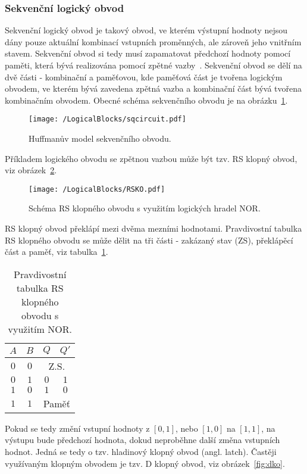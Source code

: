 \documentclass{report}
\begin{document}
\subsubsection{Sekvenční logický obvod}
Sekvenční logický obvod je takový obvod, ve kterém výstupní hodnoty nejsou dány pouze aktuální kombinací vstupních proměnných, ale zároveň jeho vnitřním stavem. Sekvenční obvod si tedy musí zapamatovat předchozí hodnoty pomocí paměti, která bývá realizována pomocí zpětné vazby~\cite{kubatova}. Sekvenční obvod se dělí na dvě části - kombinační a paměťovou, kde paměťová část je tvořena logickým obvodem, ve kterém bývá zavedena zpětná vazba a kombinační část bývá tvořena kombinačním obvodem. Obecné schéma sekvenčního obvodu je na obrázku~\ref{fig:seqcircuit}. \par
\begin{figure}
\centering
\texttt{[image: /LogicalBlocks/sqcircuit.pdf]}
\caption{Huffmanův model sekvenčního obvodu.}
\label{fig:seqcircuit}
\end{figure}
Příkladem logického obvodu se zpětnou vazbou může být tzv. RS klopný obvod, viz obrázek~\ref{fig:rsko}.
\begin{figure}
\centering
\texttt{[image: /LogicalBlocks/RSKO.pdf]}
\caption{Schéma RS klopného obvodu s využitím logických hradel NOR.}
\label{fig:rsko}
\end{figure}
RS klopný obvod překlápí mezi dvěma mezními hodnotami. Pravdivostní tabulka RS klopného obvodu se může dělit na tři části - zakázaný stav (ZS), překlápěcí část a paměť, viz tabulka~\ref{tab:rskotab}.
\begin{table}
\centering
 \begin{tabular}{ |c c|c c| } 
   	\hline
	$A$ & $B$ & $Q$ & $Q'$ \\
   	\hline
	$0$ & $0$ & \multicolumn{2}{c|}{Z.S.} \\
	$0$ & $1$ & $0$ & $1$\\
	$1$ & $0$ & $1$ & $0$\\
	$1$ & $1$ & \multicolumn{2}{c|}{Paměť}\\
   	\hline
\end{tabular}
	\caption{Pravdivostní tabulka RS klopného obvodu s využitím NOR.}
	\label{tab:rskotab}
\end{table}
Pokud se tedy změní vstupní hodnoty z $[0,1]$, nebo $[1,0]$ na $[1,1]$, na výstupu bude předchozí hodnota, dokud neproběhne další změna vstupních hodnot. Jedná se tedy o tzv. hladinový klopný obvod (angl. latch). Častěji využívaným klopným obvodem je tzv. D klopný obvod, viz obrázek~\ref{fig:dko}.
\end{document}
